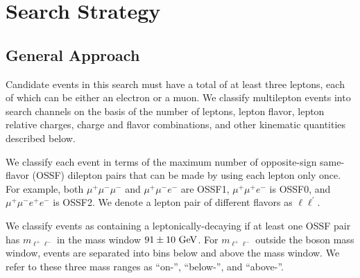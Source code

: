 \chapter{Search Strategy}
\label{chap:Strategy}

\section{General Approach}
\label{sec:Strategy/general}

Candidate events in this search must have a total of at least three leptons, each of which can be either an electron or a muon. We classify multilepton events into search channels on the basis of the number of leptons, lepton flavor, lepton relative charges, charge and flavor combinations, and other kinematic quantities described below.

We classify each event in terms of the maximum number of opposite-sign same-flavor (OSSF) dilepton pairs that can be made by using each lepton only once. For example, both $\mu^+\mu^-\mu^-$ and $\mu^+\mu^-e^-$ are OSSF1, $\mu^+\mu^+e^-$ is OSSF0, and $\mu^+\mu^-e^+e^-$ is OSSF2. We denote a lepton pair of different flavors as $\ell\ell^\prime$.

We classify events as containing a leptonically-decaying \Z if at least one OSSF pair has $m_{\ell^+\ell^-}$ in the \Z mass window $91 \pm 10\,\,\text{Ge\hspace{-.08em}V}$. For $m_{\ell^+\ell^-}$ outside the \Z boson mass window, events are separated into bins below and above the \Z mass window. We refer to these three mass ranges as ``on-\Z'', ``below-\Z'', and ``above-\Z''.

